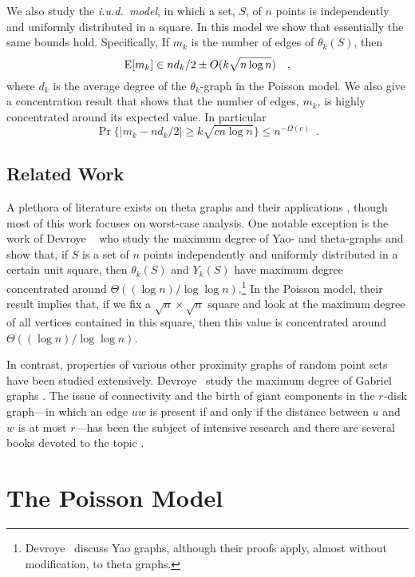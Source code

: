 \documentclass{patmorin}
\begin{document}
We also study the \emph{i.u.d.\ model}, in which a set, $S$, of $n$
points is independently and uniformly distributed in a square.  In this
model we show that essentially the same bounds hold.  Specifically,
If $m_k$ is the number of edges of $\theta_k(S)$, then
\[
    \mathrm{E}[m_k] \in nd_k/2\pm O(k\sqrt{n\log n}) \enspace \enspace ,
\]
where $d_k$ is the average degree of the $\theta_k$-graph in the Poisson
model.  We also give a concentration result that shows that the number
of edges, $m_k$, is highly concentrated around its expected value.
In particular
\[
    \Pr\{|m_k - nd_k/2| \ge k\sqrt{cn\log n}\} \le n^{-\Omega(c)} \enspace .
\]

\subsection{Related Work}

A plethora of literature exists on theta graphs \cite{S} and
their applications \cite{S}, though most of this work focuses on
worst-case analysis.  One notable exception is the work of Devroye
\etal\ \cite{devroye.gudmundsson.ea:on} who study the maximum degree
of Yao- and theta-graphs and show that, if $S$ is a set of $n$ points
independently and uniformly distributed in a certain unit square, then
$\theta_k(S)$ and $Y_k(S)$ have maximum degree concentrated around
$\Theta((\log n)/\log\log n)$.\footnote{Devroye \etal\ discuss Yao
graphs, although their proofs apply, almost without modification, to
theta graphs.}  In the Poisson model, their result implies that, if we
fix a $\sqrt{n}\times\sqrt{n}$ square and look at the maximum degree of
all vertices contained in this square, then this value is concentrated
around $\Theta((\log n)/\log\log n)$.

In contrast, properties of various other proximity graphs of random
point sets have been studied extensively.  Devroye \etal\ study the
maximum degree of Gabriel graphs \cite{devroye.gudmundsson.ea:on}.
The issue of connectivity and the birth of giant components in the
$r$-disk graph---in which an edge $uw$ is present if and only if the
distance between $u$ and $w$ is at most $r$---has been the subject of
intensive research and there are several books devoted to the topic
\cite{meester.roy:continuum,penrose:random}.


\section{The Poisson Model}
\end{document}
